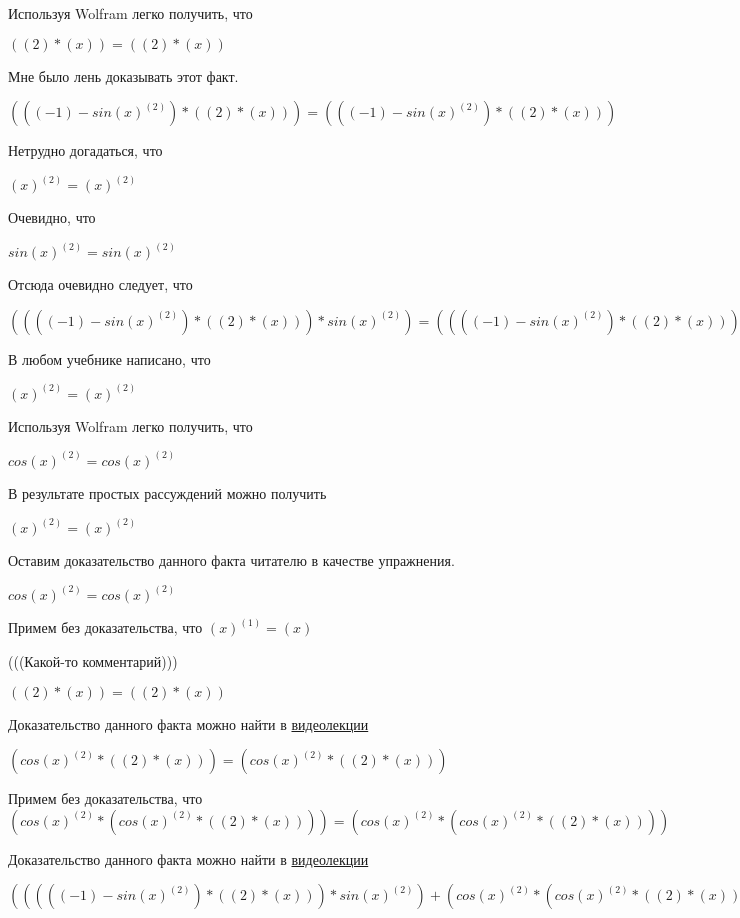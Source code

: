\documentclass[12pt,a4paper,fleqn]{article}
\theoremstyle{definition}
\begin{document}
Используя Wolfram легко получить, что

$(( 2 ) * ( x )) = (( 2 ) * ( x ))$

Мне было лень доказывать этот факт.

$((( -1 ) - sin{( x )}^{( 2 )}) * (( 2 ) * ( x ))) = ((( -1 ) - sin{( x )}^{( 2 )}) * (( 2 ) * ( x )))$

Нетрудно догадаться, что

${( x )}^{( 2 )} = {( x )}^{( 2 )}$

Очевидно, что

$sin{( x )}^{( 2 )} = sin{( x )}^{( 2 )}$

Отсюда очевидно следует, что

$(((( -1 ) - sin{( x )}^{( 2 )}) * (( 2 ) * ( x ))) * sin{( x )}^{( 2 )}) = (((( -1 ) - sin{( x )}^{( 2 )}) * (( 2 ) * ( x ))) * sin{( x )}^{( 2 )})$

В любом учебнике написано, что

${( x )}^{( 2 )} = {( x )}^{( 2 )}$

Используя Wolfram легко получить, что

$cos{( x )}^{( 2 )} = cos{( x )}^{( 2 )}$

В результате простых рассуждений можно получить

${( x )}^{( 2 )} = {( x )}^{( 2 )}$

Оставим доказательство данного факта читателю в качестве упражнения.

$cos{( x )}^{( 2 )} = cos{( x )}^{( 2 )}$

Примем без доказательства, что
${( x )}^{( 1 )} = ( x )$

(((Какой-то комментарий)))

$(( 2 ) * ( x )) = (( 2 ) * ( x ))$

Доказательство данного факта можно найти в \href{https://www.youtube.com/watch?v=dQw4w9WgXcQ}{видеолекции}

$(cos{( x )}^{( 2 )} * (( 2 ) * ( x ))) = (cos{( x )}^{( 2 )} * (( 2 ) * ( x )))$

Примем без доказательства, что
$(cos{( x )}^{( 2 )} * (cos{( x )}^{( 2 )} * (( 2 ) * ( x )))) = (cos{( x )}^{( 2 )} * (cos{( x )}^{( 2 )} * (( 2 ) * ( x ))))$

Доказательство данного факта можно найти в \href{https://www.youtube.com/watch?v=dQw4w9WgXcQ}{видеолекции}

$((((( -1 ) - sin{( x )}^{( 2 )}) * (( 2 ) * ( x ))) * sin{( x )}^{( 2 )}) + (cos{( x )}^{( 2 )} * (cos{( x )}^{( 2 )} * (( 2 ) * ( x ))))) = ((((( -1 ) - sin{( x )}^{( 2 )}) * (( 2 ) * ( x ))) * sin{( x )}^{( 2 )}) + (cos{( x )}^{( 2 )} * (cos{( x )}^{( 2 )} * (( 2 ) * ( x )))))$
\end{document}

